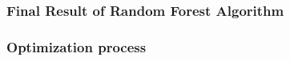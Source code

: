 \documentclass{beamer}
\begin{document}
\begin{frame}
	\frametitle{Final Result of Random Forest Algorithm}
    \begin{figure}

    \end{figure}
    \end{frame}

\begin{frame}
	\frametitle{Optimization process}
    \begin{figure}

    \end{figure}
    \end{frame}
\end{document}
